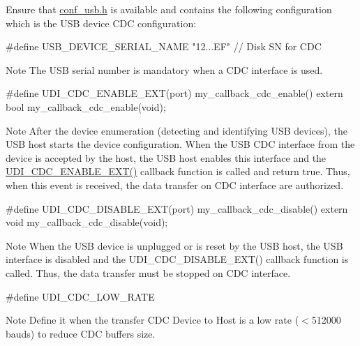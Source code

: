 \begin{DoxyEnumerate}
\item Ensure that \hyperlink{conf__usb_8h}{conf\-\_\-usb.\-h} is available and contains the following configuration which is the U\-S\-B device C\-D\-C configuration\-:
\begin{DoxyItemize}
\item 
\begin{DoxyCode}
\textcolor{preprocessor}{ #define USB\_DEVICE\_SERIAL\_NAME  "12...EF" // Disk SN for CDC }
\end{DoxyCode}
 \begin{DoxyNote}{Note}
The U\-S\-B serial number is mandatory when a C\-D\-C interface is used.
\end{DoxyNote}

\item 
\begin{DoxyCode}
\textcolor{preprocessor}{ #define UDI\_CDC\_ENABLE\_EXT(port) my\_callback\_cdc\_enable()}
\textcolor{preprocessor}{         extern bool my\_callback\_cdc\_enable(void); }
\end{DoxyCode}
 \begin{DoxyNote}{Note}
After the device enumeration (detecting and identifying U\-S\-B devices), the U\-S\-B host starts the device configuration. When the U\-S\-B C\-D\-C interface from the device is accepted by the host, the U\-S\-B host enables this interface and the \hyperlink{conf__usb_8h_a92db3a8270e5011f3154275000f8cb7d}{U\-D\-I\-\_\-\-C\-D\-C\-\_\-\-E\-N\-A\-B\-L\-E\-\_\-\-E\-X\-T()} callback function is called and return true. Thus, when this event is received, the data transfer on C\-D\-C interface are authorized.
\end{DoxyNote}

\item 
\begin{DoxyCode}
\textcolor{preprocessor}{ #define UDI\_CDC\_DISABLE\_EXT(port) my\_callback\_cdc\_disable()}
\textcolor{preprocessor}{         extern void my\_callback\_cdc\_disable(void); }
\end{DoxyCode}
 \begin{DoxyNote}{Note}
When the U\-S\-B device is unplugged or is reset by the U\-S\-B host, the U\-S\-B interface is disabled and the U\-D\-I\-\_\-\-C\-D\-C\-\_\-\-D\-I\-S\-A\-B\-L\-E\-\_\-\-E\-X\-T() callback function is called. Thus, the data transfer must be stopped on C\-D\-C interface.
\end{DoxyNote}

\item 
\begin{DoxyCode}
\textcolor{preprocessor}{ #define  UDI\_CDC\_LOW\_RATE }
\end{DoxyCode}
 \begin{DoxyNote}{Note}
Define it when the transfer C\-D\-C Device to Host is a low rate ($<$512000 bauds) to reduce C\-D\-C buffers size.
\end{DoxyNote}


\end{DoxyItemize}
\end{DoxyEnumerate}
